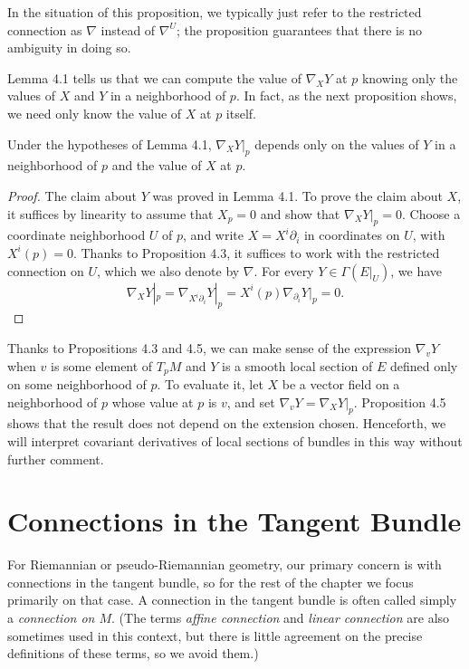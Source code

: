 In the situation of this proposition, we typically just refer to the restricted connection as $\nabla$ instead of $\nabla^U$; the proposition guarantees that there is no ambiguity in doing so.

Lemma 4.1 tells us that we can compute the value of $\nabla_X Y$ at $p$ knowing only the values of $X$ and $Y$ in a neighborhood of $p$. In fact, as the next proposition shows, we need only know the value of $X$ at $p$ itself.

\begin{proposition}\label{prop:covariant-deriv-dependence-at-point}
Under the hypotheses of Lemma 4.1, $\nabla_X Y|_p$ depends only on the values of $Y$ in a neighborhood of $p$ and the value of $X$ at $p$.
\end{proposition}

\begin{proof}
The claim about $Y$ was proved in Lemma 4.1. To prove the claim about $X$, it suffices by linearity to assume that $X_p = 0$ and show that $\nabla_X Y|_p = 0$. Choose a coordinate neighborhood $U$ of $p$, and write $X = X^i \partial_i$ in coordinates on $U$, with $X^i(p) = 0$. Thanks to Proposition 4.3, it suffices to work with the restricted connection on $U$, which we also denote by $\nabla$. For every $Y \in \Gamma(E|_U)$, we have
\[
\nabla_X Y|_p = \nabla_{X^i \partial_i} Y|_p = X^i(p)\nabla_{\partial_i} Y|_p = 0.
\]
\end{proof}

Thanks to Propositions 4.3 and 4.5, we can make sense of the expression $\nabla_v Y$ when $v$ is some element of $T_p M$ and $Y$ is a smooth local section of $E$ defined only on some neighborhood of $p$. To evaluate it, let $X$ be a vector field on a neighborhood of $p$ whose value at $p$ is $v$, and set $\nabla_v Y = \nabla_X Y|_p$. Proposition 4.5 shows that the result does not depend on the extension chosen. Henceforth, we will interpret covariant derivatives of local sections of bundles in this way without further comment.

\section{Connections in the Tangent Bundle}

For Riemannian or pseudo-Riemannian geometry, our primary concern is with connections in the tangent bundle, so for the rest of the chapter we focus primarily on that case. A connection in the tangent bundle is often called simply a \emph{connection on $M$}. (The terms \emph{affine connection} and \emph{linear connection} are also sometimes used in this context, but there is little agreement on the precise definitions of these terms, so we avoid them.)

